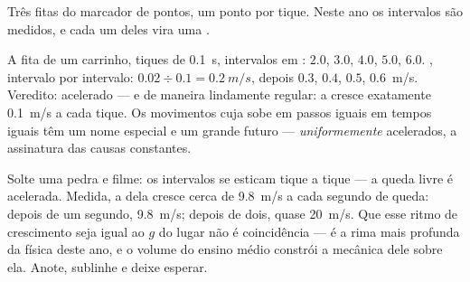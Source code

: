 \begin{omfigure}

{\small Três fitas do marcador de pontos, um ponto por tique. Neste
ano os intervalos são medidos, e cada um deles vira uma .}
\end{omfigure}

\begin{example}\label{ex:g9:uniform-varied-motion:worked}
A fita de um carrinho, tiques de \qty{0.1}{s}, intervalos em
: $2.0$, $3.0$, $4.0$, $5.0$, $6.0$. ,
intervalo por intervalo: $0.02 \div 0.1 = \qty{0.2}{m/s}$, depois
$0.3$, $0.4$, $0.5$, \qty{0.6}{m/s}. Veredito: acelerado --- e de
maneira lindamente regular: a  cresce exatamente
\qty{0.1}{m/s} a cada tique. Os movimentos cuja  sobe em
passos iguais em tempos iguais têm um nome especial e um grande
futuro --- \emph{uniformemente} acelerados, a assinatura das causas
constantes.
\end{example}

\begin{example}\label{ex:g9:uniform-varied-motion:freefall}
Solte uma pedra e filme: os intervalos se esticam tique a tique --- a
queda livre é acelerada. Medida, a  dela cresce cerca de
\qty{9.8}{m/s} a cada segundo de queda: depois de um segundo,
\qty{9.8}{m/s}; depois de dois, quase \qty{20}{m/s}. Que esse ritmo
de crescimento seja igual ao $g$ do lugar não é coincidência --- é a
rima mais profunda da física deste ano, e o volume do ensino médio
constrói a mecânica dele sobre ela. Anote, sublinhe e deixe esperar.
\end{example}

